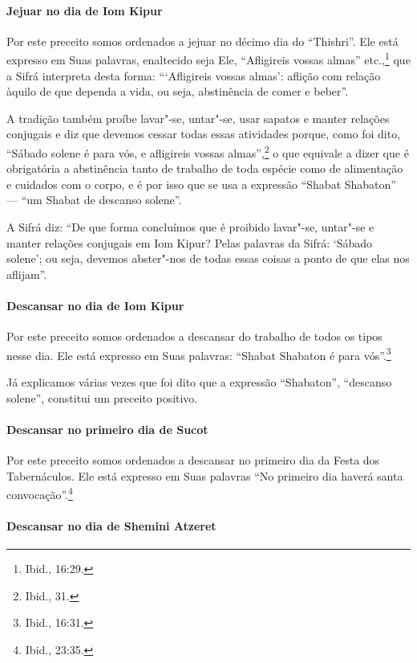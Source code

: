\begin{multicols}{2}
\paragraph{Jejuar no dia de Iom Kipur\starr}

Por este preceito somos ordenados a jejuar no décimo dia do
``Thishri''. Ele está expresso em Suas palavras, enaltecido seja Ele,
``Afligireis vossas almas'' etc.,\footnote{Ibid., 16:29.} que a Sifrá\starr{}
interpreta desta forma: ```Afligireis vossas almas': aflição com relação àquilo de que dependa a vida, ou seja, abstinência de comer e beber''.

A tradição também proíbe lavar"-se, untar"-se, usar sapatos e manter
relações conjugais e diz que devemos cessar todas essas atividades
porque, como foi dito, ``Sábado solene é para vós, e afligireis vossas
almas'',\footnote{Ibid., 31.} o que equivale a dizer que é obrigatória a
abstinência tanto de trabalho de toda espécie como de alimentação e
cuidados com o corpo, e é por isso que se usa a expressão ``Shabat
Shabaton'' --- ``um Shabat de descanso solene''.

A Sifrá\starr{} diz: ``De que forma concluímos que é proibido lavar"-se, untar"-se
e manter relações conjugais em Iom Kipur\starr? Pelas palavras da Sifrá\starr:
`Sábado solene'; ou seja, devemos abster"-nos de todas essas coisas a
ponto de que elas nos aflijam''.

\paragraph{Descansar no dia de Iom Kipur\starr}

Por este preceito somos ordenados a descansar do trabalho de todos os
tipos nesse dia. Ele está expresso em Suas palavras: ``Shabat Shabaton é
para vós''.\footnote{Ibid., 16:31.}

Já explicamos várias vezes que foi dito que a expressão ``Shabaton'',
``descanso solene'', constitui um preceito positivo.

\paragraph{Descansar no primeiro dia de Sucot\starr}

Por este preceito somos ordenados a descansar no primeiro dia da Festa
dos Tabernáculos. Ele está expresso em Suas palavras ``No primeiro dia
haverá santa convocação''.\footnote{Ibid., 23:35.}

\paragraph{Descansar no dia de Shemini Atzeret\starr}


\end{multicols}

